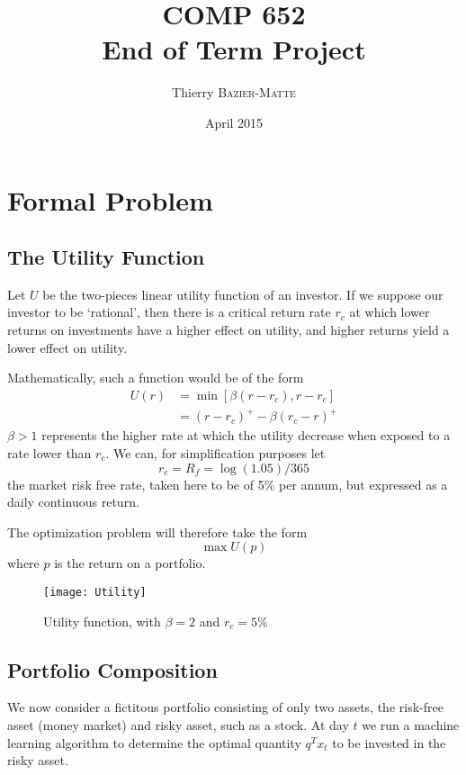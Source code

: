 \documentclass[11pt,fleqn]{article}
\title{COMP 652 \\ End of Term Project}
\author{Thierry \textsc{Bazier-Matte}}
\date{April 2015}
\begin{document}
\maketitle

\section{Formal Problem}

\subsection{The Utility Function}

Let $U$ be the two-pieces linear utility function of an investor. If we suppose our investor
to be `rational', then there is a critical return rate $r_c$ at which lower returns on
investments have a higher effect on utility, and higher returns yield a lower effect on
utility. 

Mathematically, such a function would be of the form 
\begin{align*}
  U(r) &= \min[\beta(r-r_c), r-r_c]\\
       &= (r-r_c)^+ - \beta(r_c - r)^+
\end{align*}
$\beta>1$ represents the higher rate at which the utility decrease when exposed to a rate
lower than $r_c$. We can, for simplification purposes let
\begin{equation*}
  r_c = R_f = \log(1.05)/365
\end{equation*}
the market risk free rate, taken here to be of 5\% per annum, but expressed as a daily
continuous return.

The optimization problem will therefore take the form
\begin{equation*}
  \max U(p)
\end{equation*}
where $p$ is the return on a portfolio.

\begin{figure}
  \centering
  \texttt{[image: Utility]}
  \caption{Utility function, with $\beta=2$ and $r_c=5\%$}
  \label{fig:utility}
\end{figure}

\subsection{Portfolio Composition}

We now consider a fictitous portfolio consisting of only two assets, the risk-free asset
(money market) and risky asset, such as a stock. At day $t$ we run a machine learning
algorithm to determine the optimal quantity $q^Tx_t$ to be invested in the risky asset. 
\end{document}
